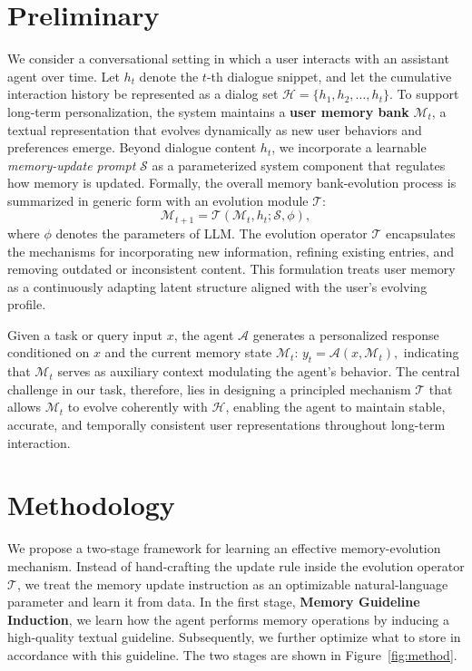 \section{Preliminary}
We consider a conversational setting in which a user interacts with an assistant agent over time. Let \( h_t \) denote the \( t \)-th dialogue snippet, and let the cumulative interaction history be represented as a dialog set
\(
\mathcal{H} = \{h_1, h_2, \ldots, h_t\}.
\)
To support long-term personalization, the system maintains a \textbf{user memory bank} \( \mathcal{M}_t \), a textual representation that evolves dynamically as new user behaviors and preferences emerge.
Beyond dialogue content \( h_t \), we incorporate a learnable \emph{memory-update prompt} \( \mathcal{S} \) as a parameterized system component that regulates how memory is updated.
Formally, the overall memory bank-evolution process is summarized in generic form with an evolution module \( \mathcal{T} \):
\begin{equation}
\mathcal{M}_{t+1} = \mathcal{T}(\mathcal{M}_t, h_t ; \mathcal{S}, \phi),
\end{equation}
where $\phi$ denotes the parameters of LLM. The evolution operator \( \mathcal{T} \) encapsulates the mechanisms for incorporating new information, refining existing entries, and removing outdated or inconsistent content. This formulation treats user memory as a continuously adapting latent structure aligned with the user’s evolving profile.

Given a task or query input \( x \), the agent \( \mathcal{A} \) generates a personalized response conditioned on \( x \) and the current memory state \( \mathcal{M}_t \):
\(
y_t = \mathcal{A}(x, \mathcal{M}_t),
\)
indicating that \( \mathcal{M}_t \) serves as auxiliary context modulating the agent’s behavior. The central challenge in our task, therefore, lies in designing a principled mechanism  \( \mathcal{T} \) that allows \( \mathcal{M}_t \) to evolve coherently with \( \mathcal{H} \), enabling the agent to maintain stable, accurate, and temporally consistent user representations throughout long-term interaction.




\section{Methodology}
We propose a two-stage framework for learning an effective memory-evolution mechanism. Instead of hand-crafting the update rule inside the evolution operator \( \mathcal{T} \), we treat the memory update instruction as an optimizable natural-language parameter and learn it from data. In the first stage, \textbf{Memory Guideline Induction}, we learn how the agent performs memory operations by inducing a high-quality textual guideline. Subsequently, we further optimize what to store in accordance with this guideline. The two stages are shown in Figure~\ref{fig:method}.

